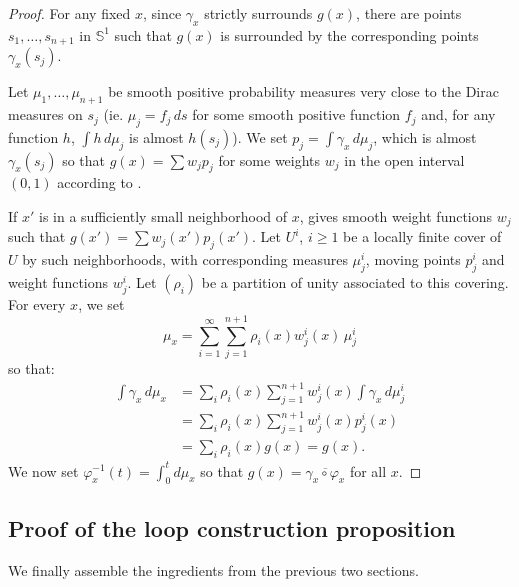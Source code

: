 \begin{proof}
  For any fixed $x$, since $γ_x$ strictly surrounds $g(x)$, there are points
  $s_1, …, s_{n+1}$ in $𝕊^1$ such that $g(x)$ is surrounded
  by the corresponding points $γ_x(s_j)$.

  Let $μ_1, …, μ_{n+1}$ be smooth positive probability measures very
  close to the Dirac measures on $s_j$ (ie. $μ_j = f_j\, ds$ for some
  smooth positive function $f_j$ and, for any function $h$,
  $\int h\,dμ_j$ is almost $h(s_j)$).  We set $p_j = \int γ_x\, d\mu_j$, which
  is almost $γ_x(s_j)$ so that $g(x) = \sum w_j p_j$ for some weights
  $w_j$ in the open interval $(0, 1)$ according to
  .

  If $x'$ is in a sufficiently small neighborhood of $x$,
   gives smooth weight functions $w_j$
  such that $g(x') = \sum w_j(x')p_j(x')$.
  Let $U^i$, $i ≥ 1$ be a locally finite cover of $U$ by such
  neighborhoods, with corresponding measures $μ_j^i$, moving points
  $p_j^i$ and weight functions $w_j^i$.
  Let $(ρ_i)$ be a partition of unity associated to this covering. For
  every $x$, we set
  \[
    μ_x = \sum_{i=1}^∞ \sum_{j=1}^{n+1} ρ_i(x)w_j^i(x)\, μ_j^i
  \]
  so that:
  \begin{align*}
    \int γ_x\, dμ_x &=
    \sum_i ρ_i(x)\sum_{j=1}^{n+1} w_j^i(x) \int γ_x\, dμ_j^i\\
    &= \sum_i ρ_i(x)\sum_{j=1}^{n+1} w_j^i(x) p_j^i(x)\\
    &= \sum_i ρ_i(x) g(x) = g(x).
  \end{align*}
  We now set $φ_x^{-1}(t) = \int_0^tdμ_x$ so that
  $g(x) = \overline{γ_x ∘ φ_x}$ for all $x$.
\end{proof}

\subsection{Proof of the loop construction proposition}
\label{sub:proof_of_the_loop_construction_proposition}

We finally assemble the ingredients from the previous two sections.

